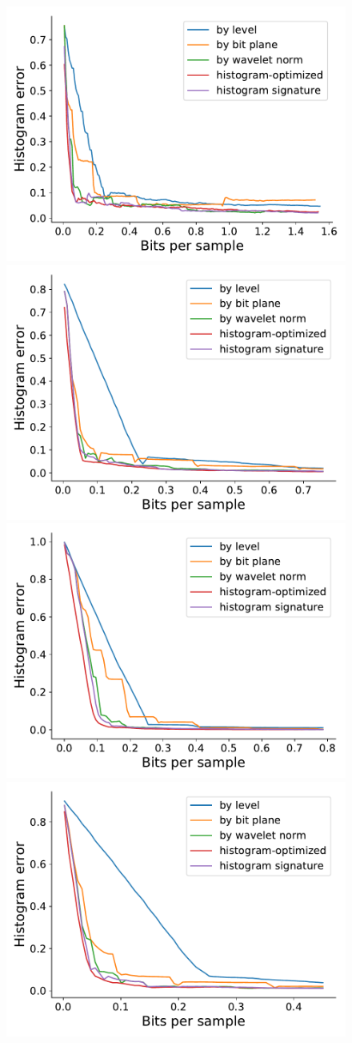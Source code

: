 \begin{figure}[h]
	\centering
	{\includegraphics[width=0.48\linewidth]{img/histogram/64bins/histogram-optimized-boiler.pdf}}
	{\includegraphics[width=0.48\linewidth]{img/histogram/64bins/histogram-optimized-diffusivity.pdf}}
	{\includegraphics[width=0.48\linewidth]{img/histogram/64bins/histogram-optimized-euler.pdf}}
	{\includegraphics[width=0.48\linewidth]{img/histogram/64bins/histogram-optimized-pressure.pdf}}

\end{figure}
